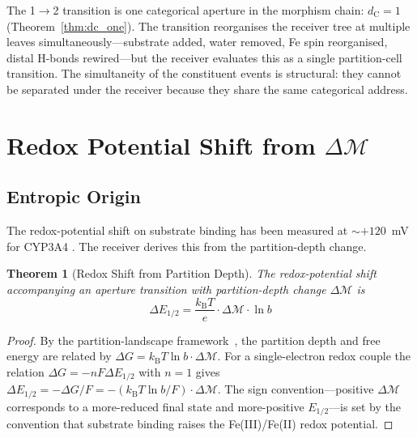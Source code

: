 \documentclass[11pt,twocolumn,a4paper]{article}
\newtheorem{theorem}{Theorem}[section]
\theoremstyle{definition}
\theoremstyle{remark}
\newcommand{\kB}{k_{\mathrm{B}}}
\newcommand{\depth}{\mathcal{M}}
\newcommand{\dC}{d_{\mathrm{C}}}
\begin{document}
The 1$\to$2 transition is one categorical aperture in the morphism chain: $\dC = 1$ (Theorem~\ref{thm:dc_one}). The transition reorganises the receiver tree at multiple leaves simultaneously---substrate added, water removed, Fe spin reorganised, distal H-bonds rewired---but the receiver evaluates this as a single partition-cell transition. The simultaneity of the constituent events is structural: they cannot be separated under the receiver because they share the same categorical address.

\section{Redox Potential Shift from $\Delta\depth$}
\label{sec:redox_shift}

\subsection{Entropic Origin}

The redox-potential shift on substrate binding has been measured at $\sim +120$~mV for CYP3A4 \citep{daff1997}. The receiver derives this from the partition-depth change.

\begin{theorem}[Redox Shift from Partition Depth]
\label{thm:redox_shift}
The redox-potential shift accompanying an aperture transition with partition-depth change $\Delta\depth$ is
\begin{equation}
\Delta E_{1/2} = \frac{\kB T}{e} \cdot \Delta\depth \cdot \ln b
\label{eq:redox_shift}
\end{equation}
\end{theorem}

\begin{proof}
By the partition-landscape framework~\citep{sachikonye2025_landscape}, the partition depth and free energy are related by $\Delta G = \kB T \ln b \cdot \Delta\depth$. For a single-electron redox couple the relation $\Delta G = -nF\Delta E_{1/2}$ with $n=1$ gives $\Delta E_{1/2} = -\Delta G/F = -(\kB T \ln b/F) \cdot \Delta\depth$. The sign convention---positive $\Delta\depth$ corresponds to a more-reduced final state and more-positive $E_{1/2}$---is set by the convention that substrate binding raises the Fe(III)/Fe(II) redox potential.
\end{proof}
\end{document}
